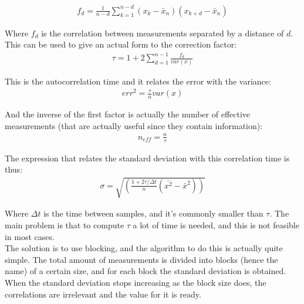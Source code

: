\documentclass[11pt]{article}
\begin{document}
		\begin{align}
			f_d=\frac{1}{n-d}\sum_{k=1}^{n-d}{\left(x_k-\bar{x}_n\right)\left(x_{k+d}-\bar{x}_n\right)}
		\end{align}

		Where $f_d$ is the correlation between measurements separated by a distance of $d$. This can be used to give an actual form to the correction factor:\\

		\begin{align}
			\tau=1+2\sum_{d=1}^{n-1}{\frac{f_d}{var\left(x\right)}}
		\end{align}

		This is the autocorrelation time and it relates the error with the variance:\\

		\begin{align}
			err^2=\frac{\tau}{n}var\left(x\right)
		\end{align}

		And the inverse of the first factor is actually the number of effective measurements (that are actually useful since they contain information):\\

		\begin{align}
			n_{eff}=\frac{n}{\tau}
		\end{align}

		The expression that relates the standard deviation with this correlation time is thus:\\

		\begin{align}
			\sigma=\sqrt{\left(\frac{1+2\tau/\Delta t}{n}\left(\bar{x^2}-\bar{x}^2\right)\right)}
		\end{align}

		Where $\Delta t$ is the time between samples, and it's commonly smaller than $\tau$. The main problem is that to compute $\tau$ a lot of time is needed, and this is not feasible in most cases.\\

		The solution is to use blocking, and the algorithm to do this is actually quite simple. The total amount of measurements is divided into blocks (hence the name) of a certain size, and for each block the standard deviation is obtained. When the standard deviation stops increasing as the block size does, the correlations are irrelevant and the value for it is ready.\\
\end{document}
